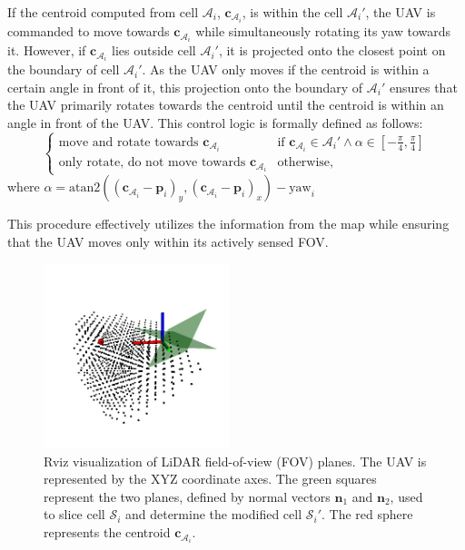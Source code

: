             If the centroid computed from cell $\mathcal{A}_i$, $\mathbf{c}_{\mathcal{A}_i}$, is within the cell $\mathcal{A}_i'$, the \ac{UAV} is commanded to move towards $\mathbf{c}_{\mathcal{A}_i}$ while simultaneously rotating its yaw towards it.
            However, if $\mathbf{c}_{\mathcal{A}_i}$ lies outside cell $\mathcal{A}_i'$, it is projected onto the closest point on the boundary of cell $\mathcal{A}_i'$.
            As the \ac{UAV} only moves if the centroid is within a certain angle in front of it, this projection onto the boundary of $\mathcal{A}_i'$ ensures that the \ac{UAV} primarily rotates towards the centroid until the centroid is within an angle in front of the \ac{UAV}.
            This control logic is formally defined as follows:
            \begin{equation}
                \begin{cases}
                    \text{move and rotate towards } \mathbf{c}_{\mathcal{A}_i} & \text{if } \mathbf{c}_{\mathcal{A}_i} \in \mathcal{A}_i' \land \alpha \in [-\frac{\pi}{4}, \frac{\pi}{4}] \\
                    \text{only rotate, do not move towards } \mathbf{c}_{\mathcal{A}_i} & \text{otherwise, }
                \end{cases}
            \end{equation}
            where $\alpha = \text{atan2}((\mathbf{c}_{\mathcal{A}_i} - \mathbf{p}_i)_y, (\mathbf{c}_{\mathcal{A}_i} - \mathbf{p}_i)_x) - \text{yaw}_i$

            This procedure effectively utilizes the information from the map while ensuring that the \ac{UAV} moves only within its actively sensed \ac{FOV}.

            \begin{figure}[H]
                \centering
                \includegraphics[width=0.48\textwidth]{./fig/rviz/cell_a_sliced_with_planes.png}
                \caption{
                    Rviz visualization of LiDAR field-of-view (FOV) planes. The \ac{UAV} is represented by the XYZ coordinate axes. 
                    The green squares represent the two planes, defined by normal vectors $\mathbf{n}_1$ and $\mathbf{n}_2$, used to slice cell $\mathcal{S}_i$ and determine the modified cell $\mathcal{S}_i'$.
                    The red sphere represents the centroid $\mathbf{c}_{\mathcal{A}_i}$.
                }
                \label{fig:cell_a_sliced}
            \end{figure}
    
